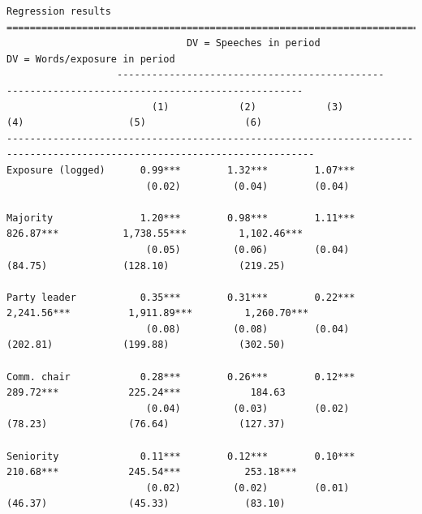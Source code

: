 \documentclass[letter,12pt]{article}
\begin{document}
\begin{table} \centering 
  \begin{tiny}
\begin{verbatim}
Regression results
============================================================================================================================
                               DV = Speeches in period                           DV = Words/exposure in period           
                   ----------------------------------------------     ---------------------------------------------------
                         (1)            (2)            (3)                (4)                  (5)                 (6)       
---------------------------------------------------------------------------------------------------------------------------
Exposure (logged)      0.99***        1.32***        1.07***                                                               
                        (0.02)         (0.04)        (0.04)                                                                
                                                                                                                           
Majority               1.20***        0.98***        1.11***           826.87***           1,738.55***         1,102.46*** 
                        (0.05)         (0.06)        (0.04)             (84.75)             (128.10)            (219.25)   
                                                                                                                           
Party leader           0.35***        0.31***        0.22***          2,241.56***          1,911.89***         1,260.70*** 
                        (0.08)         (0.08)        (0.04)             (202.81)            (199.88)            (302.50)   
                                                                                                                           
Comm. chair            0.28***        0.26***        0.12***           289.72***            225.24***            184.63    
                        (0.04)         (0.03)        (0.02)             (78.23)              (76.64)            (127.37)   
                                                                                                                           
Seniority              0.11***        0.12***        0.10***           210.68***            245.54***           253.18***  
                        (0.02)         (0.02)        (0.01)             (46.37)              (45.33)             (83.10)   
                                                                                                                           

\end{verbatim}
\end{tiny}
\end{table}
\end{document}
